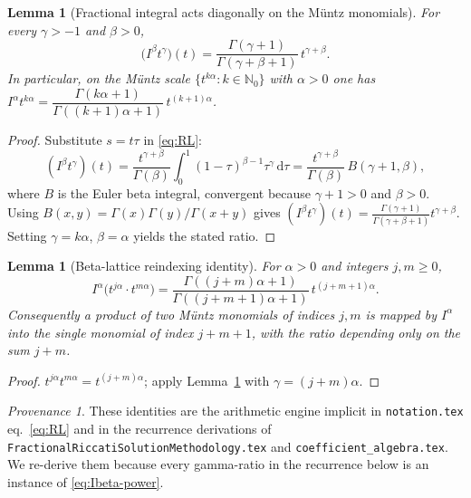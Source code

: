 \documentclass[11pt]{article}
\newcommand{\N}{\mathbb{N}}
\newcommand{\dd}{\mathrm{d}}
\theoremstyle{plain}
\newtheorem{lemma}[theorem]{Lemma}
\theoremstyle{definition}
\theoremstyle{remark}
\newtheorem*{provenance}{Provenance}
\begin{document}
\begin{lemma}[Fractional integral acts diagonally on the Müntz monomials]
\label{lem:muntz-monomial}
For every $\gamma>-1$ and $\beta>0$,
\begin{equation}\label{eq:Ibeta-power}
   \bigl(I^\beta t^{\gamma}\bigr)(t)=\frac{\Gamma(\gamma+1)}{\Gamma(\gamma+\beta+1)}\,
   t^{\gamma+\beta}.
\end{equation}
In particular, on the Müntz scale $\{t^{k\alpha}:k\in\N_0\}$ with $\alpha>0$ one has
$I^\alpha t^{k\alpha}=\dfrac{\Gamma(k\alpha+1)}{\Gamma((k+1)\alpha+1)}\,t^{(k+1)\alpha}$.
\end{lemma}
\begin{proof}
Substitute $s=t\tau$ in \eqref{eq:RL}:
\[
   (I^\beta t^\gamma)(t)=\frac{t^{\gamma+\beta}}{\Gamma(\beta)}\int_0^1
   (1-\tau)^{\beta-1}\tau^{\gamma}\,\dd\tau
   =\frac{t^{\gamma+\beta}}{\Gamma(\beta)}\,B(\gamma+1,\beta),
\]
where $B$ is the Euler beta integral, convergent because $\gamma+1>0$ and
$\beta>0$. Using $B(x,y)=\Gamma(x)\Gamma(y)/\Gamma(x+y)$ gives
$(I^\beta t^\gamma)(t)=\frac{\Gamma(\gamma+1)}{\Gamma(\gamma+\beta+1)}t^{\gamma+\beta}$.
Setting $\gamma=k\alpha$, $\beta=\alpha$ yields the stated ratio.
\end{proof}

\begin{lemma}[Beta-lattice reindexing identity]\label{lem:beta-reindex}
For $\alpha>0$ and integers $j,m\ge0$,
\[
   I^\alpha\!\bigl(t^{j\alpha}\cdot t^{m\alpha}\bigr)
   =\frac{\Gamma((j+m)\alpha+1)}{\Gamma((j+m+1)\alpha+1)}\,t^{(j+m+1)\alpha}.
\]
Consequently a product of two Müntz monomials of indices $j,m$ is mapped by
$I^\alpha$ into the single monomial of index $j+m+1$, with the ratio depending
only on the sum $j+m$.
\end{lemma}
\begin{proof}
$t^{j\alpha}t^{m\alpha}=t^{(j+m)\alpha}$; apply Lemma~\ref{lem:muntz-monomial}
with $\gamma=(j+m)\alpha$.
\end{proof}

\begin{provenance}
These identities are the arithmetic engine implicit in \texttt{notation.tex}
eq.~\eqref{eq:RL} and in the recurrence derivations of
\texttt{FractionalRiccatiSolutionMethodology.tex} and
\texttt{coefficient\_algebra.tex}. We re-derive them because every gamma-ratio in
the recurrence below is an instance of \eqref{eq:Ibeta-power}.
\end{provenance}
\end{document}
